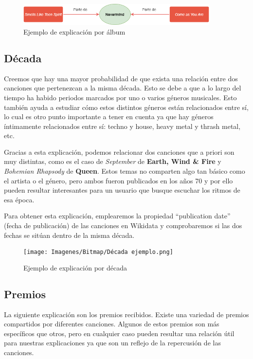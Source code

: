 \begin{figure}[h!]
	\centering
	\includegraphics[width = 0.9\textwidth]{Imagenes/Bitmap/Álbum ejemplo.png}
	\caption{Ejemplo de explicación por álbum}
	\label{fig:sampleImage}
\end{figure}

\subsection*{Década}

Creemos que hay una mayor probabilidad de que exista una relación entre dos canciones que pertenezcan a la misma década. Esto se debe a que a lo largo del tiempo ha habido periodos marcados por uno o varios géneros musicales. Esto también ayuda a estudiar cómo estos distintos géneros están relacionados entre sí, lo cual es otro punto importante a tener en cuenta ya que hay géneros íntimamente relacionados entre sí: techno y house, heavy metal y thrash metal, etc.

Gracias a esta explicación, podemos relacionar dos canciones que a priori son muy distintas, como es el caso de \textit{September} de \textbf{Earth, Wind \& Fire} y \textit{Bohemian Rhapsody} de \textbf{Queen}. Estos temas no comparten algo tan básico como el artista o el género, pero ambos fueron publicados en los años 70 y por ello pueden resultar interesantes para un usuario que busque escuchar los ritmos de esa época.

Para obtener esta explicación, emplearemos la propiedad ``publication date'' (fecha de publicación) de las canciones en Wikidata y comprobaremos si las dos fechas se sitúan dentro de la misma década.\\

\begin{figure}[h!]
	\centering
	\texttt{[image: Imagenes/Bitmap/Década ejemplo.png]}
	\caption{Ejemplo de explicación por década}
	\label{fig:sampleImage}
\end{figure}

\subsection*{Premios}

La siguiente explicación son los premios recibidos. Existe una variedad de premios compartidos por diferentes canciones. Algunos de estos premios son más específicos que otros, pero en cualquier caso pueden resultar una relación útil para nuestras explicaciones ya que son un reflejo de la repercusión de las canciones.

